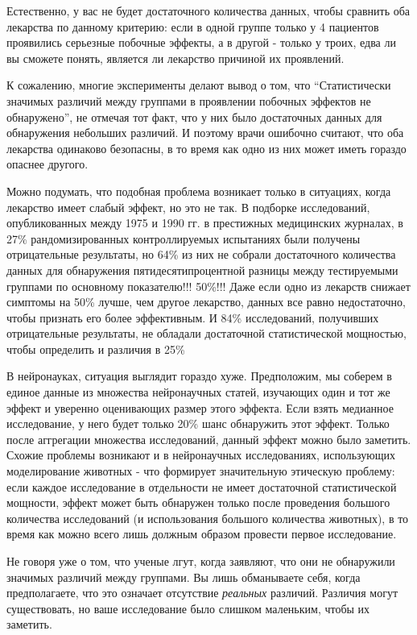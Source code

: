 Естественно, у вас не будет достаточного количества данных, чтобы сравнить оба лекарства по данному критерию: если в одной группе только у 4 пациентов проявились серьезные побочные эффекты, а в другой - только у троих, едва ли вы сможете понять, является ли лекарство причиной их проявлений.


К сожалению, многие эксперименты делают вывод о том, что ``Статистически значимых различий между группами в проявлении побочных эффектов не обнаружено'', не отмечая тот факт, что у них было достаточных данных для обнаружения небольших различий\cite{tsang_inadequate_2009}. И поэтому врачи ошибочно считают, что оба лекарства одинаково безопасны, в то время как одно из них может иметь гораздо опаснее другого.

Можно подумать, что подобная проблема возникает только в ситуациях, когда лекарство имеет слабый эффект, но это не так. В подборке исследований, опубликованных между 1975 и 1990 гг. в престижных медицинских журналах, в 27\% рандомизированных контроллируемых испытаниях были получены отрицательные результаты, но 64\% из них не собрали достаточного количества данных для обнаружения пятидесятипроцентной разницы между тестируемыми группами по основному показателю!!! 50\%!!! Даже если одно из лекарств снижает симптомы на 50\% лучше, чем другое лекарство, данных все равно недостаточно, чтобы признать его более эффективным. И 84\% исследований, получивших отрицательные результаты, не обладали достаточной статистической мощностью, чтобы определить и различия в 25\% \cite{moher_statistical_1994,bedard_statistical_2007,brown_1987,chung_1998}

В нейронауках, ситуация выглядит гораздо хуже. Предположим, мы соберем в единое данные из множества нейронаучных статей, изучающих один и тот же эффект и уверенно оценивающих размер этого эффекта. Если взять медианное исследование, у него будет только 20\% шанс обнаружить этот эффект. Только после аггрегации множества исследований, данный эффект можно было заметить. Схожие проблемы возникают и в нейронаучных исследованиях, использующих моделирование животных - что формирует значительную этическую проблему: если каждое исследование в отдельности не имеет достаточной статистической мощности, эффект может быть обнаружен только после проведения большого количества исследований (и использования большого количества животных), в то время как можно всего лишь должным образом провести первое исследование\cite{button_power_2013}.

Не говоря уже о том, что ученые лгут, когда заявляют, что они не обнаружили значимых различий между группами. Вы лишь обманываете себя, когда предполагаете, что это означает отсутствие \emph{реальных} различий. Различия могут существовать, но ваше исследование было слишком маленьким, чтобы их заметить.

